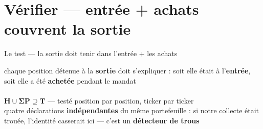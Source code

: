 \documentclass[11pt,aspectratio=169]{beamer}
\newcommand{\colV}{}
\begin{document}
\section{Vérifier — entrée + achats couvrent la sortie}
\begin{frame}{Le test — la sortie doit tenir dans l'entrée + les achats}
  \colV
  \centering
  {\footnotesize chaque position détenue à la \textbf{sortie} doit s'expliquer :
   soit elle était à l'\textbf{entrée}, soit elle a été \textbf{achetée} pendant le mandat}\\[2mm]
  \\[2mm]
  {\footnotesize \(\mathbf{H \cup \Sigma P \supseteq T}\) — testé position par position, ticker par ticker}\\[1mm]
  {\scriptsize\color{black!60} quatre déclarations \textbf{indépendantes} du même portefeuille : si notre
   collecte était trouée, l'identité casserait ici — c'est un \textbf{détecteur de trous}}
\end{frame}
\end{document}
